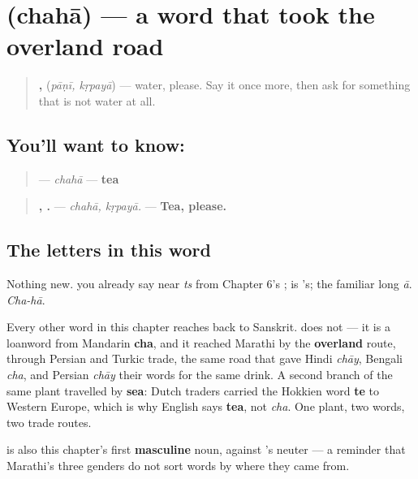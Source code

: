 \section[chahā]{ (chahā) — a word that took the overland road}

\label{lesson:MR-C10-chaha}



\begin{quote}
\textbf{, } (\emph{pāṇī, kṛpayā}) — water, please. Say it once more, then ask for something that is not water at all.
\end{quote}

\subsection*{You'll want to know: }
\begin{quote}
\textbf{} — \emph{chahā} — \textbf{tea}
\end{quote}

\begin{quote}
\textbf{, .} — \emph{chahā, kṛpayā.} — \textbf{Tea, please.}
\end{quote}

\subsection*{The letters in this word}
Nothing new. \textbf{} you already say near \emph{ts} from Chapter 6's \textbf{}; \textbf{} is \textbf{}'s; \textbf{} the familiar long \emph{ā}. \emph{Cha-hā}.

\begin{cousinweb}
Every other word in this chapter reaches back to Sanskrit. \textbf{} does not — it is a loanword from Mandarin \textbf{cha}, and it reached Marathi by the \textbf{overland} route, through Persian and Turkic trade, the same road that gave Hindi \textbf{} \emph{chāy}, Bengali \emph{cha}, and Persian \emph{chāy} their words for the same drink. A second branch of the same plant travelled by \textbf{sea}: Dutch traders carried the Hokkien word \textbf{te} to Western Europe, which is why English says \textbf{tea}, not \emph{cha}. One plant, two words, two trade routes.

\textbf{} is also this chapter's first \textbf{masculine} noun, against \textbf{}'s neuter — a reminder that Marathi's three genders do not sort words by where they came from.
\end{cousinweb}

